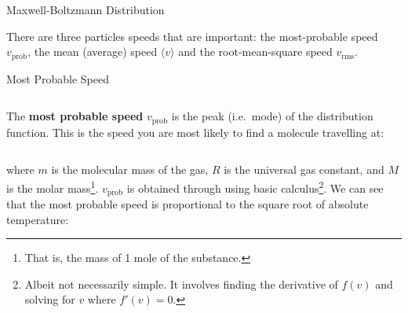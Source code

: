 \documentclass[12pt,aspectratio=169,dvipsnames]{beamer}
\begin{document}
\begin{frame}{Maxwell-Boltzmann Distribution}
  \begin{center}
  \end{center}
  There are three particles speeds that are important: the most-probable speed
  $v_\text{prob}$, the mean (average) speed $\langle v \rangle$ and the
  root-mean-square speed $v_\text{rms}$.
\end{frame}



\begin{frame}{Most Probable Speed}
  \begin{columns}
    
    The \textbf{most probable speed} $v_\text{prob}$ is the peak (i.e.\ mode)
    of the distribution function. This is the speed you are most likely to find
    a molecule travelling at:

  \end{columns}
  \vspace{-.05in}where $m$ is the molecular mass of the gas, $R$ is the
  universal gas constant, and $M$ is the molar mass\footnote{That is, the mass
  of 1 mole of the substance.}. $v_\text{prob}$ is obtained through using basic
  calculus\footnote{Albeit not necessarily simple. It involves finding the
  derivative of $f(v)$ and solving for $v$ where $f'(v)=0$.}. We can see that
  the most probable speed is proportional to the square root of absolute
  temperature:
  
\end{frame}
\end{document}
